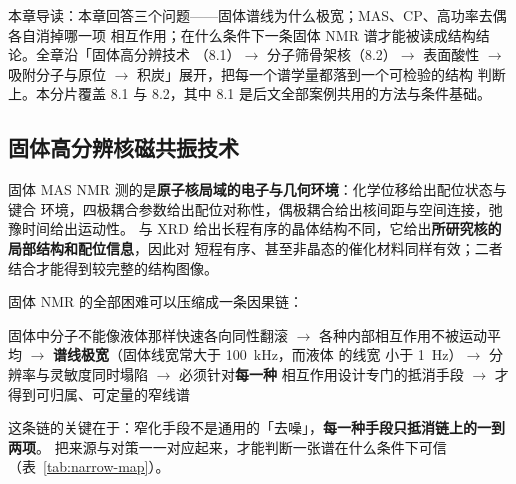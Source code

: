 
%
{本章导读：本章回答三个问题——固体谱线为什么极宽；MAS、CP、高功率去偶各自消掉哪一项
相互作用；在什么条件下一条固体 NMR 谱才能被读成结构结论。全章沿「固体高分辨技术
（8.1）$\rightarrow$ 分子筛骨架核（8.2）$\rightarrow$ 表面酸性 $\rightarrow$
吸附分子与原位 $\rightarrow$ 积炭」展开，把每一个谱学量都落到一个可检验的结构
判断上。本分片覆盖 8.1 与 8.2，其中 8.1 是后文全部案例共用的方法与条件基础。}
\label{ch:08}

\subsection{固体高分辨核磁共振技术}

\begin{probout}
固体 MAS NMR 测的是\textbf{原子核局域的电子与几何环境}：化学位移给出配位状态与键合
环境，四极耦合参数给出配位对称性，偶极耦合给出核间距与空间连接，弛豫时间给出运动性。
与 XRD 给出长程有序的晶体结构不同，它给出\textbf{所研究核的局部结构和配位信息}，因此对
短程有序、甚至非晶态的催化材料同样有效；二者结合才能得到较完整的结构图像。
\end{probout}

固体 NMR 的全部困难可以压缩成一条因果链：

\begin{center}
\fontsize{9}{13}\selectfont
固体中分子不能像液体那样快速各向同性翻滚 $\rightarrow$ 各种内部相互作用不被运动平均
$\rightarrow$ \textbf{谱线极宽}（固体线宽常大于 \qty{100}{kHz}，而液体  的线宽
小于 \qty{1}{Hz}）$\rightarrow$ 分辨率与灵敏度同时塌陷 $\rightarrow$ 必须针对\textbf{每一种}
相互作用设计专门的抵消手段 $\rightarrow$ 才得到可归属、可定量的窄线谱
\end{center}

这条链的关键在于：窄化手段不是通用的「去噪」，\textbf{每一种手段只抵消链上的一到两项}。
把来源与对策一一对应起来，才能判断一张谱在什么条件下可信（表~\ref{tab:narrow-map}）。

